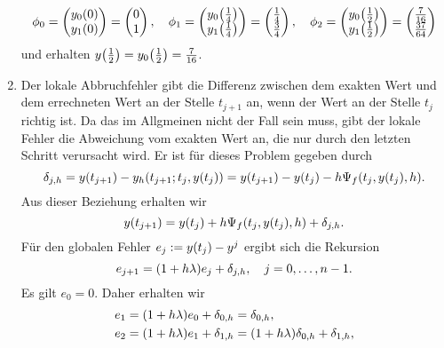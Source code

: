 \documentclass{exercise}
\begin{document}
\begin{enumerate}
		\[
			\phi_0 = \begin{pmatrix}
				y_0\parentheses*{0}\\
				y_1\parentheses*{0}
			\end{pmatrix} = \begin{pmatrix}
				0\\
				1
			\end{pmatrix}, \quad \phi_1 = \begin{pmatrix}
				y_0\parentheses*{\frac{1}{4}}\\
				y_1\parentheses*{\frac{1}{4}}
			\end{pmatrix} = \begin{pmatrix}
				\frac{1}{4}\\
				\frac{3}{4}
			\end{pmatrix}, \quad \phi_2 = \begin{pmatrix}
				y_0\parentheses*{\frac{1}{2}}\\
				y_1\parentheses*{\frac{1}{2}}
			\end{pmatrix} = \begin{pmatrix}
				\frac{7}{16}\\
				\frac{37}{64}
			\end{pmatrix}
		\]
		und erhalten \(y\parentheses*{\frac{1}{2}} = y_0\parentheses*{\frac{1}{2}} = \frac{7}{16}\).
		\item Der lokale Abbruchfehler gibt die Differenz zwischen dem exakten Wert und dem errechneten Wert an der Stelle \(t_{j + 1}\) an, wenn der Wert an der Stelle \(t_j\) richtig ist.
		Da das im Allgmeinen nicht der Fall sein muss, gibt der lokale Fehler die Abweichung vom exakten Wert an, die nur durch den letzten Schritt verursacht wird.
		Er ist für dieses Problem gegeben durch
		\[
			\delta_{j, h} = y\parentheses*{t_{j + 1}} - y_h\parentheses*{t_{j + 1}; t_j, y\parentheses*{t_j}} = y\parentheses*{t_{j + 1}} - y\parentheses*{t_j} - h\Psi_f\parentheses*{t_j, y\parentheses*{t_j}, h}.
		\]
		Aus dieser Beziehung erhalten wir
		\[
			y\parentheses*{t_{j + 1}} = y\parentheses*{t_j} + h\Psi_f\parentheses*{t_j, y\parentheses*{t_j}, h} + \delta_{j, h}.
		\]
		Für den globalen Fehler \(e_j := y\parentheses*{t_j} - y^j\) ergibt sich die Rekursion
		\[
			e_{j + 1} = \parentheses*{1 + h\lambda}e_j + \delta_{j, h}, \quad j = 0, \ldots, n - 1.
		\]
		Es gilt \(e_0 = 0\).
		Daher erhalten wir
		\begin{align*}
			e_1 &= \parentheses*{1 + h\lambda}e_0 + \delta_{0, h} = \delta_{0, h},\\
			e_2 &= \parentheses*{1 + h\lambda}e_1 + \delta_{1, h} = \parentheses*{1 + h\lambda}\delta_{0, h} + \delta_{1, h},\\

\end{align*}
\end{enumerate}
\end{document}
